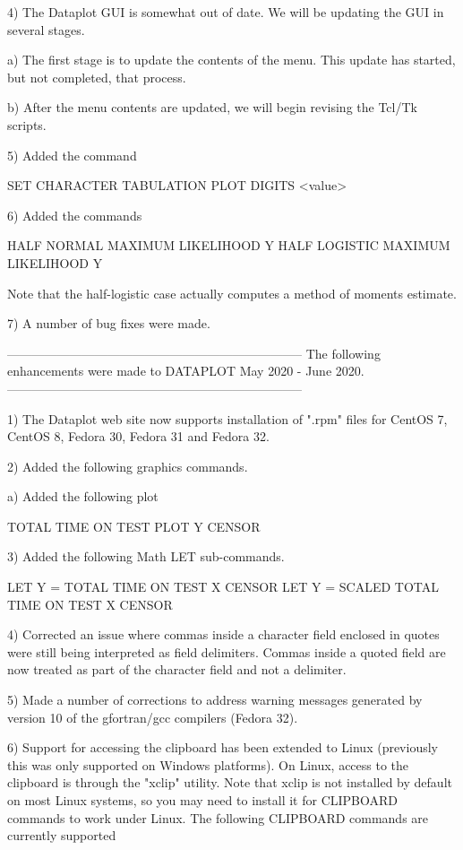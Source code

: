   4) The Dataplot GUI is somewhat out of date.  We will be updating the
     GUI in several stages.

     a) The first stage is to update the contents of the menu.  This
        update has started, but not completed, that process.

     b) After the menu contents are updated, we will begin revising
        the Tcl/Tk scripts.

  5) Added the command

         SET CHARACTER TABULATION PLOT DIGITS <value>

  6) Added the commands

         HALF NORMAL MAXIMUM LIKELIHOOD Y
         HALF LOGISTIC MAXIMUM LIKELIHOOD Y

     Note that the half-logistic case actually computes a method
     of moments estimate.

  7) A number of bug fixes were made.

-----------------------------------------------------------------------
The following enhancements were made to DATAPLOT
May 2020 - June 2020.
-----------------------------------------------------------------------

 1) The Dataplot web site now supports installation of ".rpm" files
    for CentOS 7, CentOS 8, Fedora 30, Fedora 31 and Fedora 32.

 2) Added the following graphics commands.

    a) Added the following plot

          TOTAL TIME ON TEST PLOT Y CENSOR

 3) Added the following Math LET sub-commands.

      LET Y = TOTAL TIME ON TEST        X CENSOR
      LET Y = SCALED TOTAL TIME ON TEST X CENSOR

 4) Corrected an issue where commas inside a character field enclosed
    in quotes were still being interpreted as field delimiters.  Commas
    inside a quoted field are now treated as part of the character
    field and not a delimiter.

 5) Made a number of corrections to address warning messages generated
    by version 10 of the gfortran/gcc compilers (Fedora 32).

 6) Support for accessing the clipboard has been extended to Linux
    (previously this was only supported on Windows platforms).  On
    Linux, access to the clipboard is through the "xclip" utility.
    Note that xclip is not installed by default on most Linux systems,
    so you may need to install it for CLIPBOARD commands to work under
    Linux.  The following CLIPBOARD commands are currently supported

